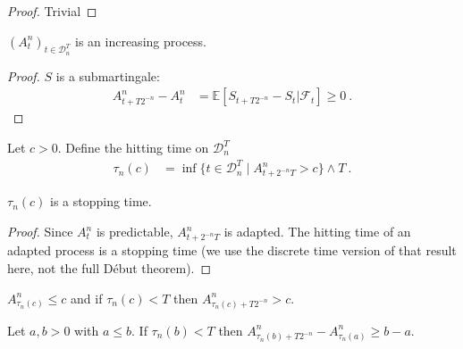 \begin{proof}
  Trivial
\end{proof}


\begin{lemma}\label{lem:Predict_Part_Increasing}
  $(A^n_t)_{t\in\mathcal{D}_n^T}$ is an increasing process.
\end{lemma}

\begin{proof}
$S$ is a submartingale:
\begin{align*}
  A^n_{t+T2^{-n}} - A^n_t
  &= \mathbb{E}\left[ S_{t+T2^{-n}}-S_t|\mathcal{F}_t\right] \ge 0
  \: .
\end{align*}
\end{proof}


\begin{definition}\label{def:hittingAGT}
Let $c>0$. Define the hitting time on $\mathcal{D}^T_n$
\begin{align*}
  \tau_n(c)
  &= \inf\{t \in \mathcal{D}^T_n \mid A^n_{t + 2^{-n}T} > c\} \wedge T
  \: .
\end{align*}
\end{definition}


\begin{lemma}\label{lem:IsStoppingTime_hittingAGT}
  $\tau_n(c)$ is a stopping time.
\end{lemma}

\begin{proof}
Since $A^n_{t}$ is predictable, $A^n_{t + 2^{-n}T}$ is adapted.
The hitting time of an adapted process is a stopping time (we use the discrete time version of that result here, not the full Début theorem).
\end{proof}


\begin{lemma}\label{lem:A_hittingAGT_le}
$A^n_{\tau_n(c)} \le c$ and if $\tau_n(c) < T$ then $A^n_{\tau_n(c)+T2^{-n}} > c$.
\end{lemma}




\begin{lemma}\label{lem:A_hittingAGT_sub_ge}
Let $a, b > 0$ with $a \le b$. If $\tau_n(b) < T$ then $A^n_{\tau_n(b)+T2^{-n}} - A^n_{\tau_n(a)} \ge b - a$.
\end{lemma}


